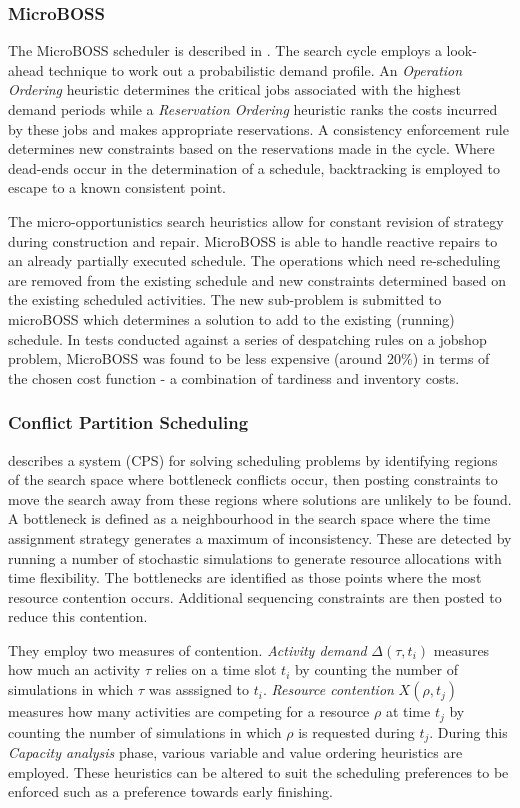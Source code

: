 \subsubsection{MicroBOSS}
The MicroBOSS scheduler is described in \citep{sadeh91lookahead}. The search cycle employs a look-ahead technique to work out a probabilistic demand profile. An \emph{Operation Ordering} heuristic determines the critical jobs associated with the  highest demand periods while a \emph{Reservation Ordering} heuristic ranks the costs incurred by these jobs and makes appropriate reservations. A consistency enforcement rule determines new constraints based on the reservations made in the cycle. Where dead-ends occur in the determination of a schedule, backtracking is employed to escape to a known consistent point.

 The micro-opportunistics search heuristics allow for constant revision of strategy during construction and repair. MicroBOSS is able to handle reactive repairs to an already partially executed schedule. The operations which need re-scheduling are removed from the existing schedule and new constraints determined based on the existing scheduled activities. The new sub-problem is submitted to microBOSS which determines a solution to add to the existing (running) schedule. In tests conducted against a series of despatching rules on a jobshop problem, MicroBOSS was found to be less expensive (around 20\%) in terms of the chosen cost function - a combination of tardiness and inventory costs. 


\subsubsection{Conflict Partition Scheduling}
\citet{muscettola92bottleneck} describes a system (CPS) for solving scheduling problems by identifying regions of the search space where bottleneck conflicts occur, then posting constraints to move the search away from these regions where solutions are unlikely to be found. A bottleneck is defined as a neighbourhood in the search space where the time assignment strategy generates a maximum of inconsistency. These are detected by running a number of stochastic simulations to generate resource allocations with time flexibility. The bottlenecks are identified as those points where the most resource contention occurs. Additional sequencing constraints are then posted to reduce this contention. 

They employ two measures of contention. \emph{Activity demand} $\Delta(\tau,t_i)$ measures how much an activity $\tau$ relies on a time slot $t_i$ by counting the number of simulations in which $\tau$ was asssigned to $t_i$. \emph{Resource contention} $X(\rho,t_j)$ measures how many activities are competing for a resource $\rho$ at time $t_j$ by counting the number of simulations in which $\rho$ is requested during $t_j$. During this \emph{Capacity analysis} phase, various variable and value ordering heuristics are employed. These heuristics can be altered to suit the scheduling preferences to be enforced such as a preference towards early finishing.


